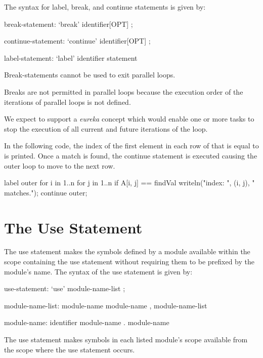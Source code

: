 The syntax for label, break, and continue statements is given by:
\begin{syntax}
break-statement:
  `break' identifier[OPT] ;

continue-statement:
  `continue' identifier[OPT] ;

label-statement:
  `label' identifier statement
\end{syntax}

Break-statements cannot be used to exit parallel loops.  

\begin{rationale}
Breaks are not permitted in parallel loops because the execution order
of the iterations of parallel loops is not defined.
\end{rationale}

\begin{future}
We expect to support a \emph{eureka} concept which would enable one or
more tasks to stop the execution of all current and future iterations
of the loop.
\end{future}

\begin{example}
In the following code, the index of the first element in each row of
 that is equal to  is printed.  Once a match is
found, the continue statement is executed causing the outer loop to
move to the next row.
\begin{chapel}
label outer for i in 1..n {
  for j in 1..n {
    if A[i, j] == findVal {
      writeln("index: ", (i, j), " matches.");
      continue outer;
    }
  }
}
\end{chapel}
\end{example}

\section{The Use Statement}
\label{The_Use_Statement}

The use statement makes the symbols defined by a module available
within the scope containing the use statement without requiring them
to be prefixed by the module's name.  The syntax of the use statement
is given by:

\begin{syntax}
use-statement:
  `use' module-name-list ;

module-name-list:
  module-name
  module-name , module-name-list

module-name:
  identifier
  module-name . module-name
\end{syntax}
The use statement makes symbols in each listed module's scope available
from the scope where the use statement occurs.

